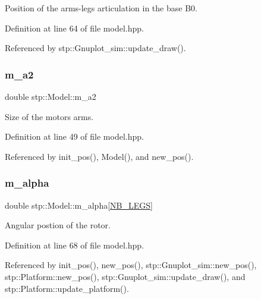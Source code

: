 Position of the arms-\/legs articulation in the base B0. 

Definition at line 64 of file model.\+hpp.



Referenced by stp\+::\+Gnuplot\+\_\+sim\+::update\+\_\+draw().

\mbox{\label{classstp_1_1_model_ad189b43e75b3b4a7a947e8142adce17c}} 
\subsubsection{\texorpdfstring{m\+\_\+a2}{m\_a2}}
{\footnotesize\ttfamily double stp\+::\+Model\+::m\+\_\+a2\hspace{0.3cm}{\ttfamily [protected]}}

Size of the motors\textquotesingle{} arms. 

Definition at line 49 of file model.\+hpp.



Referenced by init\+\_\+pos(), Model(), and new\+\_\+pos().

\mbox{\label{classstp_1_1_model_a8faca0ba2206f1ac384b80b2223a0c34}} 
\subsubsection{\texorpdfstring{m\+\_\+alpha}{m\_alpha}}
{\footnotesize\ttfamily double stp\+::\+Model\+::m\+\_\+alpha\mbox{[}\hyperlink{model_8hpp_ae44092ed043cb4350e2df47fdee890b9}{N\+B\+\_\+\+L\+E\+GS}\mbox{]}\hspace{0.3cm}{\ttfamily [protected]}}

Angular postion of the rotor. 

Definition at line 68 of file model.\+hpp.



Referenced by init\+\_\+pos(), new\+\_\+pos(), stp\+::\+Gnuplot\+\_\+sim\+::new\+\_\+pos(), stp\+::\+Platform\+::new\+\_\+pos(), stp\+::\+Gnuplot\+\_\+sim\+::update\+\_\+draw(), and stp\+::\+Platform\+::update\+\_\+platform().

\mbox{\label{classstp_1_1_model_a0b4fbb6fdec8106993ddffbd9f61d6ce}} 
